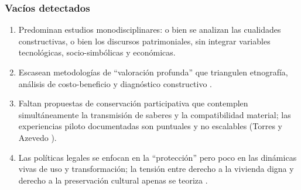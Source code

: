 \subsubsection{Vacíos detectados}

\begin{enumerate}
  \item Predominan estudios monodisciplinares: o bien se analizan las cualidades constructivas, o bien los discursos patrimoniales, sin integrar variables tecnológicas, socio-simbólicas y económicas.

  \item Escasean metodologías de ``valoración profunda'' que triangulen etnografía, análisis de costo-beneficio y diagnóstico constructivo \citep{delatorre2002values}.

  \item Faltan propuestas de conservación participativa que contemplen simultáneamente la transmisión de saberes y la compatibilidad material; las experiencias piloto documentadas son puntuales y no escalables (Torres y Azevedo \citeyear{torres2021transmision}).

  \item Las políticas legales se enfocan en la ``protección'' pero poco en las dinámicas vivas de uso y transformación; la tensión entre derecho a la vivienda digna y derecho a la preservación cultural apenas se teoriza \citep{herrejon1994}.
\end{enumerate}
